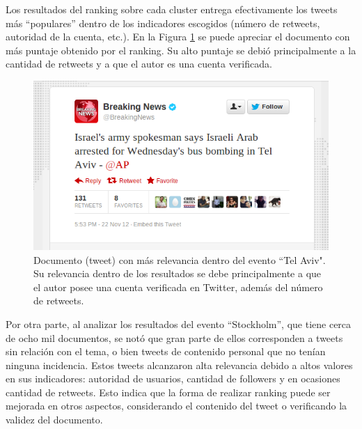     Los resultados del ranking sobre cada cluster entrega
    efectivamente los tweets más ``populares'' dentro de los indicadores
    escogidos (número de retweets, autoridad de la cuenta, etc.). En
    la Figura \ref{fig:bn} se puede apreciar el documento con más
    puntaje obtenido por el ranking. Su alto puntaje se debió
    principalmente a la cantidad de retweets y a que el autor es una
    cuenta verificada.

\begin{figure}    
  \centering
  \includegraphics[width=14cm]{./img/breakingnews.png}
  \caption[Documento con alto puntaje entre los resultados obtenidos]
   { Documento (tweet) con más relevancia dentro del evento ``Tel Aviv". Su relevancia dentro de los resultados se debe principalmente a que el autor posee una cuenta verificada en Twitter, además del número de retweets. \label{fig:bn} }
\end{figure}

    Por otra parte, al analizar los resultados del evento
    ``Stockholm'', que tiene cerca de ocho mil documentos, se notó que
    gran parte de ellos corresponden a tweets sin relación con el tema,
    o bien tweets de contenido personal que no tenían ninguna
    incidencia. Estos tweets alcanzaron alta relevancia debido a altos
    valores en sus indicadores: autoridad de usuarios, cantidad de followers 
    y en ocasiones cantidad de retweets. Esto indica que la forma de
    realizar ranking puede ser mejorada en otros aspectos,
    considerando el contenido del tweet o verificando la validez del documento.

